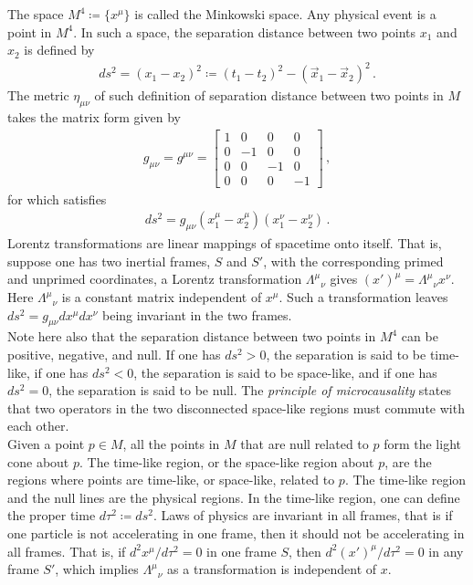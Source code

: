 \documentclass[11pt, onesided]{book}
\theoremstyle{break}
\theoremstyle{break}
\newcommand{\bmat}[1]{\begin{bmatrix} #1 \end{bmatrix}}
\begin{document}
The space $M^4 \coloneqq \{x^\mu\}$ is called the Minkowski space. Any physical event is a point in $M^4$. In such a space, the separation distance between two points $x_1$ and $x_2$ is defined by
\begin{align*}
ds^2 =(x_1 - x_2)^2\coloneqq (t_1 - t_2)^2 - (\vec{x}_1 - \vec{x}_2)^2 \,.
\end{align*}
The metric $\eta_{\mu\nu}$ of such definition of separation distance between two points in $M$ takes the matrix form given by
\begin{align*}
g_{\mu\nu} = g^{\mu \nu} = \bmat{1 & 0 & 0&0\\0&-1&0&0\\0 &0 &-1&0\\0&0&0&-1}\,,
\end{align*}
for which satisfies 
\begin{align*}
ds^2 = g_{\mu\nu}(x_1^\mu - x_2^{\mu}) (x_1^{\nu}-x_2^{\nu})\, .
\end{align*}
Lorentz transformations are linear mappings of spacetime onto itself. That is, suppose one has two inertial frames, $S$ and $S'$, with the corresponding primed and unprimed coordinates, a Lorentz transformation $\Lambda^\mu{}_\nu$ gives $(x')^\mu = \Lambda^\mu{}_\nu x^\nu$. Here $\Lambda^\mu{}_{\nu}$ is a constant matrix independent of $x^\mu$. Such a transformation leaves $ds^2 = g_{\mu\nu}dx^\mu dx^\nu$ being invariant in the two frames.\\

Note here also that the separation distance between two points in $M^4$ can be positive, negative, and null. If one has $ds^2 >0$, the separation is said to be time-like, if one has $ds^2 < 0$, the separation is said to be space-like, and if one has $ds^2 = 0$, the separation is said to be null. The \textit{principle of microcausality} states that two operators in the two disconnected space-like regions must commute with each other. \\

Given a point $p\in M$, all the points in $M$ that are null related to $p$ form the light cone about $p$. The time-like region, or the space-like region about $p$, are the regions where points are time-like, or space-like, related to $p$. The time-like region and the null lines are the physical regions. In the time-like region, one can define the proper time $d\tau^2 \coloneqq ds^2 $. Laws of physics are invariant in all frames, that is if one particle is not accelerating in one frame, then it should not be accelerating in all frames. That is, if $d^2x^\mu / d\tau^2 = 0$ in one frame $S$, then $d^2(x')^\mu/d\tau^2 = 0$ in any frame $S'$, which implies $\Lambda^\mu{}_\nu$ as a transformation is independent of $x$. \\
\end{document}
